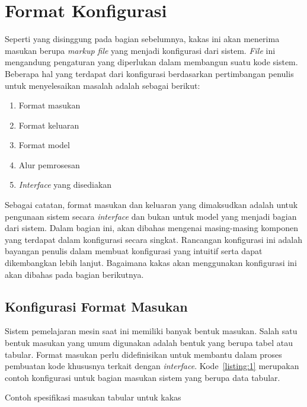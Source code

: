 \section{Format Konfigurasi}

Seperti yang disinggung pada bagian sebelumnya, kakas ini akan menerima masukan berupa \textit{markup file} yang menjadi konfigurasi dari sistem.
\textit{File} ini mengandung pengaturan yang diperlukan dalam membangun suatu kode sistem.
Beberapa hal yang terdapat dari konfigurasi berdasarkan pertimbangan penulis untuk menyelesaikan masalah adalah sebagai berikut:

\begin{enumerate}
	\item Format masukan
	\item Format keluaran
	\item Format model
	\item Alur pemrosesan
	\item \textit{Interface} yang disediakan
\end{enumerate}

Sebagai catatan, format masukan dan keluaran yang dimaksudkan adalah untuk pengunaan sistem secara \textit{interface} dan bukan untuk model yang menjadi bagian dari sistem.
Dalam bagian ini, akan dibahas mengenai masing-masing komponen yang terdapat dalam konfigurasi secara singkat.
Rancangan konfigurasi ini adalah bayangan penulis dalam membuat konfigurasi yang intuitif serta dapat dikembangkan lebih lanjut.
Bagaimana kakas akan menggunakan konfigurasi ini akan dibahas pada bagian berikutnya.

\subsection{Konfigurasi Format Masukan}\label{section:03-input-format}

Sistem pemelajaran mesin saat ini memiliki banyak bentuk masukan.
Salah satu bentuk masukan yang umum digunakan adalah bentuk yang berupa tabel atau tabular.
Format masukan perlu didefinisikan untuk membantu dalam proses pembuatan kode khususnya terkait dengan \textit{interface}.
Kode~\ref{listing:1} merupakan contoh konfigurasi untuk bagian masukan sistem yang berupa data tabular.

\begin{code}
	\caption{Contoh spesifikasi masukan tabular untuk kakas}\label{listing:1}
\end{code}

